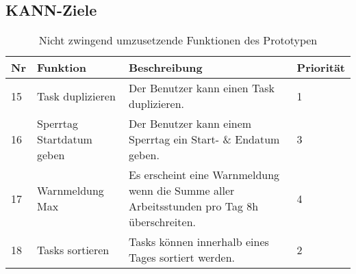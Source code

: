 \subsection{KANN-Ziele}
\begin{table}[!ht]
\begin{center}
    \begin{tabular}{llp{8cm}l}
        \toprule Nr & Funktion & Beschreibung & Priorität \\
        \midrule 15 & Task duplizieren & Der Benutzer kann einen Task duplizieren. & 1\\
        \midrule 16 & Sperrtag Startdatum geben & Der Benutzer kann einem Sperrtag ein Start- \& Endatum geben. &  3\\ 
        \midrule 17 & Warnmeldung Max & Es erscheint eine Warnmeldung wenn die Summe aller Arbeitsstunden pro Tag 8h überschreiten. & 4\\
        \midrule 18 & Tasks sortieren & Tasks können innerhalb eines Tages sortiert werden. & 2\\
        \bottomrule
    \end{tabular}
    \caption{Nicht zwingend umzusetzende Funktionen des Prototypen}
    \label{tab:kann_funktionen}
\end{center}
\end{table}


% 
